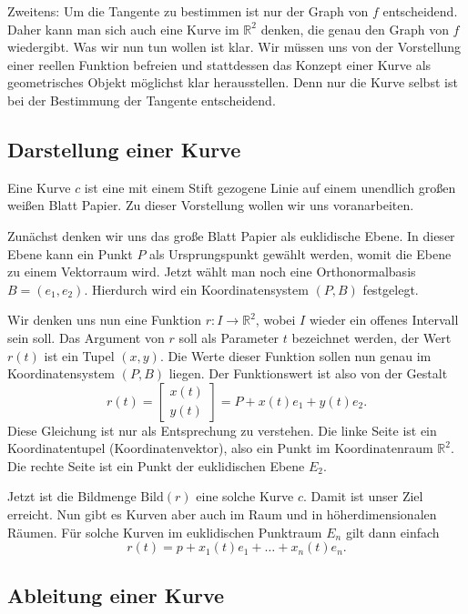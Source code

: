\documentclass[a4paper,12pt,fleqn,dvipdfmx]{article}
\begin{document}
Zweitens: Um die Tangente zu bestimmen ist nur der Graph von $f$
entscheidend. Daher kann man sich auch eine Kurve im $\mathbb R^2$
denken, die genau den Graph von $f$ wiedergibt. Was wir nun tun
wollen ist klar. Wir müssen uns von der Vorstellung einer reellen
Funktion befreien und stattdessen das Konzept einer Kurve als
geometrisches Objekt möglichst klar herausstellen. Denn nur die
Kurve selbst ist bei der Bestimmung der Tangente entscheidend.

\subsection{Darstellung einer Kurve}

Eine Kurve $c$ ist eine mit einem Stift gezogene Linie auf einem
unendlich großen weißen Blatt Papier. Zu dieser Vorstellung wollen
wir uns voranarbeiten.

Zunächst denken wir uns das große Blatt Papier als euklidische
Ebene. In dieser Ebene kann ein Punkt $P$ als Ursprungspunkt
gewählt werden, womit die Ebene zu einem Vektorraum wird.
Jetzt wählt man noch eine Orthonormalbasis $B=(e_1,e_2)$.
Hierdurch wird ein Koordinatensystem $(P,B)$ festgelegt.

Wir denken uns nun eine Funktion $r\colon I\to\mathbb R^2$,
wobei $I$ wieder ein offenes Intervall sein soll.
Das Argument von $r$ soll als Parameter $t$ bezeichnet werden,
der Wert $r(t)$ ist ein Tupel $(x,y)$. Die Werte dieser Funktion
sollen nun genau im Koordinatensystem $(P,B)$ liegen. Der
Funktionswert ist also von der Gestalt
\begin{equation}
r(t) = \begin{bmatrix}
x(t)\\ y(t)
\end{bmatrix}
= P+x(t)e_1+y(t)e_2.
\end{equation}
Diese Gleichung ist nur als Entsprechung zu verstehen. Die linke Seite
ist ein Koordinatentupel (Koordinatenvektor), also ein Punkt im
Koordinatenraum $\mathbb R^2$. Die rechte Seite
ist ein Punkt der euklidischen Ebene $E_2$.

Jetzt ist die Bildmenge $\mathrm{Bild}(r)$ eine solche
Kurve $c$. Damit ist unser Ziel erreicht. Nun gibt es Kurven
aber auch im Raum und in höherdimensionalen Räumen. Für solche
Kurven im euklidischen Punktraum $E_n$ gilt dann einfach%
\begin{equation}
r(t) = p+x_1(t)e_1+\ldots+x_n(t)e_n.
\end{equation}

\subsection{Ableitung einer Kurve}
\end{document}
